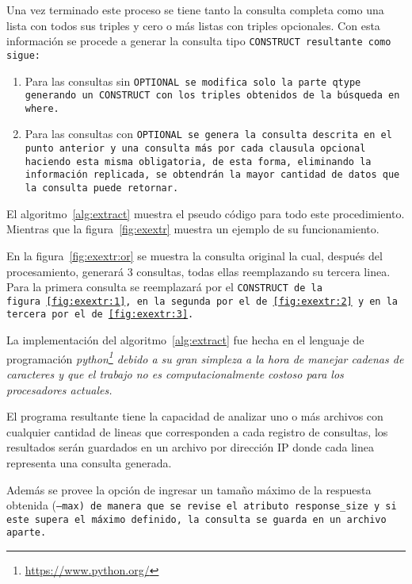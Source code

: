 Una vez terminado este proceso se tiene tanto la consulta completa como una
lista con todos sus triples  y cero o más listas con triples
opcionales.
Con esta información se procede a generar la consulta tipo \tt{CONSTRUCT}
resultante como sigue:
\begin{enumerate}
  \item
    Para las consultas sin \tt{OPTIONAL} se modifica solo la parte \tt{qtype}
    generando un \tt{CONSTRUCT} con los triples obtenidos de la búsqueda en
    \tt{where}.
  \item
    Para las consultas con \tt{OPTIONAL} se genera la consulta descrita en el
    punto anterior y una consulta más por cada clausula opcional haciendo esta
    misma obligatoria, de esta forma, eliminando la información replicada, se 
    obtendrán la mayor cantidad de datos que la consulta puede retornar.
\end{enumerate}


El algoritmo~\ref{alg:extract} muestra el pseudo código para todo este
procedimiento. Mientras que la figura~\ref{fig:exextr} muestra un ejemplo de
su funcionamiento.



En la figura~\ref{fig:exextr:or} se muestra la consulta original la cual,
después del procesamiento, generará 3 consultas, todas ellas reemplazando su
tercera linea. Para la primera consulta se reemplazará por el \tt{CONSTRUCT} de
la figura~\ref{fig:exextr:1}, en la segunda por el de~\ref{fig:exextr:2} y en la
tercera por el de~\ref{fig:exextr:3}.



La implementación del algoritmo~\ref{alg:extract} fue hecha en el lenguaje de
programación \it{python}\footnote{\url{https://www.python.org/}}
debido a su gran simpleza a la hora de manejar cadenas
de caracteres y que el trabajo no es computacionalmente costoso para los
procesadores actuales.

El programa resultante tiene la capacidad de analizar uno o más archivos con
cualquier cantidad de lineas que corresponden a cada registro de consultas,
los resultados serán guardados en un archivo por dirección IP donde cada linea
representa una consulta generada.

Además se provee la opción de ingresar un tamaño máximo de la respuesta obtenida
(\tt{--max}) de manera que se revise el atributo \tt{response\_size} y si este
supera el máximo definido, la consulta se guarda en un archivo aparte.

